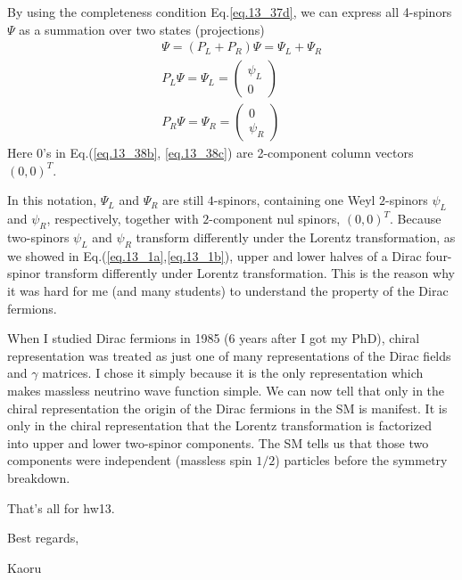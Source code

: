 \documentclass[12pt]{article}
\begin{document}
  By using the completeness condition Eq.\ref{eq.13_37d}, we can express all 4-spinors
  $\Psi$ as a summation over two states (projections)
\begin{eqnarray}
  &&\Psi = (P_L + P_R) \Psi = \Psi_L + \Psi_R \label{eq.13_38a} \\ 
  && P_L \Psi = \Psi_L = 
  \begin{pmatrix}
    \psi_L \\ 0
  \end{pmatrix} \label{eq.13_38b} \\ 
  &&P_R \Psi = \Psi_R =
  \begin{pmatrix}
    0 \\ \psi_R
  \end{pmatrix}\label{eq.13_38c}
\end{eqnarray}
 Here 0's in Eq.(\ref{eq.13_38b}, \ref{eq.13_38c}) are 2-component column vectors $(0,0)^T$.

  In this notation, $\Psi_L$ and $\Psi_R$ are still $4$-spinors, containing
  one Weyl $2$-spinors $\psi_L$ and $\psi_R$, respectively, together with
  $2$-component nul spinors, $(0,0)^T$.  Because two-spinors $\psi_L$ and
  $\psi_R$ transform differently under the Lorentz transformation, as
  we showed in Eq.(\ref{eq.13_1a},\ref{eq.13_1b}), upper and lower halves of a Dirac four-spinor
  transform differently under Lorentz transformation.  This is the
  reason why it was hard for me (and many students) to understand the
  property of the Dirac fermions.

  When I studied Dirac fermions in 1985 (6 years after I got my PhD),
  chiral representation was treated as just one of many representations
  of the Dirac fields and $\gamma$ matrices.  I chose it simply because
  it is the only representation which makes massless neutrino wave
  function simple.  We can now tell that only in the chiral representation
  the origin of the Dirac fermions in the SM is manifest.  It is only
  in the chiral representation that the Lorentz transformation is
  factorized into upper and lower two-spinor components.  The SM tells
  us that those two components were independent (massless spin $1/2$)
  particles before the symmetry breakdown.

That's all for hw13.

Best regards,

Kaoru
\end{document}
